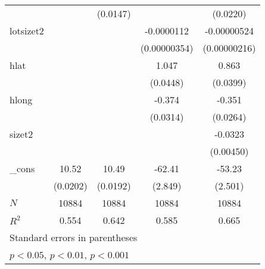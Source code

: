 {\begin{tabular}{l*{4}{c}}
            &                     &    (0.0147)         &                     &    (0.0220)         \\
[1em]
lotsizet2   &                     &                     &  -0.0000112\sym{**} & -0.00000524\sym{*}  \\
            &                     &                     &(0.00000354)         &(0.00000216)         \\
[1em]
hlat        &                     &                     &       1.047\sym{***}&       0.863\sym{***}\\
            &                     &                     &    (0.0448)         &    (0.0399)         \\
[1em]
hlong       &                     &                     &      -0.374\sym{***}&      -0.351\sym{***}\\
            &                     &                     &    (0.0314)         &    (0.0264)         \\
[1em]
sizet2      &                     &                     &                     &     -0.0323\sym{***}\\
            &                     &                     &                     &   (0.00450)         \\
[1em]
\_cons      &       10.52\sym{***}&       10.49\sym{***}&      -62.41\sym{***}&      -53.23\sym{***}\\
            &    (0.0202)         &    (0.0192)         &     (2.849)         &     (2.501)         \\
\hline
\(N\)       &       10884         &       10884         &       10884         &       10884         \\
\(R^{2}\)   &       0.554         &       0.642         &       0.585         &       0.665         \\
\hline\hline
\multicolumn{5}{l}{\footnotesize Standard errors in parentheses}\\
\multicolumn{5}{l}{\footnotesize \sym{*} \(p<0.05\), \sym{**} \(p<0.01\), \sym{***} \(p<0.001\)}\\
\end{tabular}
}
